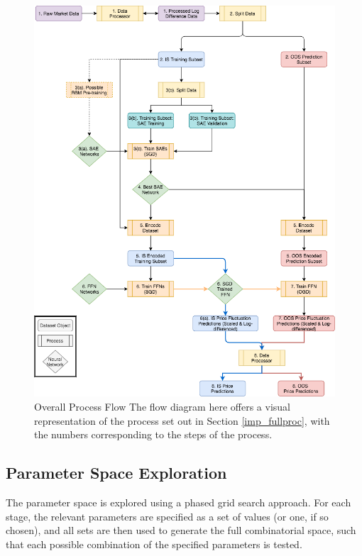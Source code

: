 \documentclass[a4paper,11pt,oneside]{article}
\theoremstyle{plain}
\theoremstyle{definition}
\begin{document}
	\begin{figure}[H]
		\centering \includegraphics[scale=0.6]{images/process_implementation/process_flow.png}
		\caption[Overall Process Flow Diagram]{Overall Process Flow
		\newline The flow diagram here offers a visual representation of the process set out in Section \ref{imp_fullproc}, with the numbers corresponding to the steps of the process.}
		\label{figure-proc_diagram}
	\end{figure}
	
	\subsection{Parameter Space Exploration}\label{proc_parameters}
	
	The parameter space is explored using a phased grid search approach. For each stage, the relevant parameters are specified as a set of values (or one, if so chosen), and all sets are then used to generate the full combinatorial space, such that each possible combination of the specified parameters is tested.
	
\end{document}
